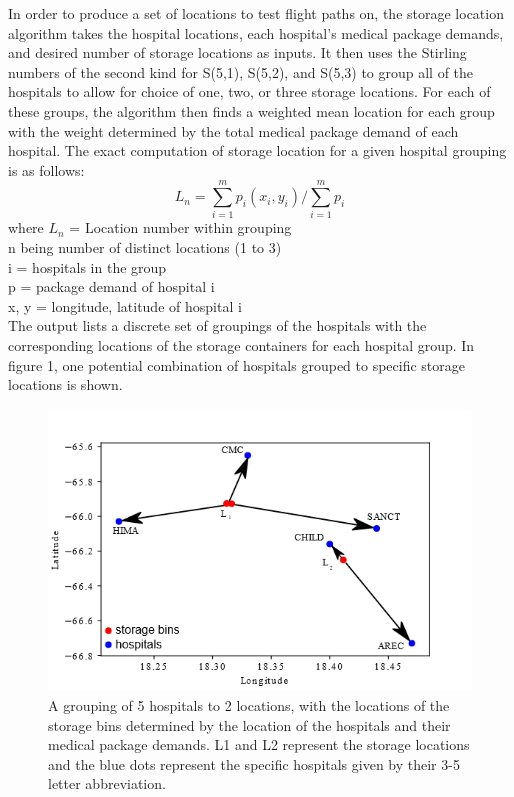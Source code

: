\documentclass[twocolumn,10pt]{asme2ej}
\begin{document}
In order to produce a set of locations to test flight paths on, the storage location algorithm takes the hospital locations, each hospital's medical package demands, and desired number of storage locations as inputs. It then uses the Stirling numbers of the second kind for S(5,1), S(5,2), and S(5,3) to group all of the hospitals to allow for choice of one, two, or three storage locations. For each of these groups, the algorithm then finds a weighted mean location for each group with the weight determined by the total medical package demand of each hospital. The exact computation of storage location for a given hospital grouping is as follows:
\[ 
L_n = \sum_{i=1}^{m} p_i(x_i, y_i) / \sum_{i=1}^{m} p_i 
\]
where $L_n$ = Location number within grouping \\
n being number of distinct locations (1 to 3) \\
i = hospitals in the group \\
p = package demand of hospital i \\
x, y = longitude, latitude of hospital i \\
The output lists a discrete set of groupings of the hospitals with the corresponding locations of the storage containers for each hospital group. In figure 1, one potential combination of hospitals grouped to specific storage locations is shown. 

\begin{figure}
	\centering
	\includegraphics[width=1\linewidth]{../storage_fig2}
	\caption[Fig 1]{A grouping of 5 hospitals to 2 locations, with the locations of the storage bins determined by the location of the hospitals and their medical package demands. L1 and L2 represent the storage locations and the blue dots represent the specific hospitals given by their 3-5 letter abbreviation.}
	\label{Fig 1}
	\end{figure}
	
\end{document}
